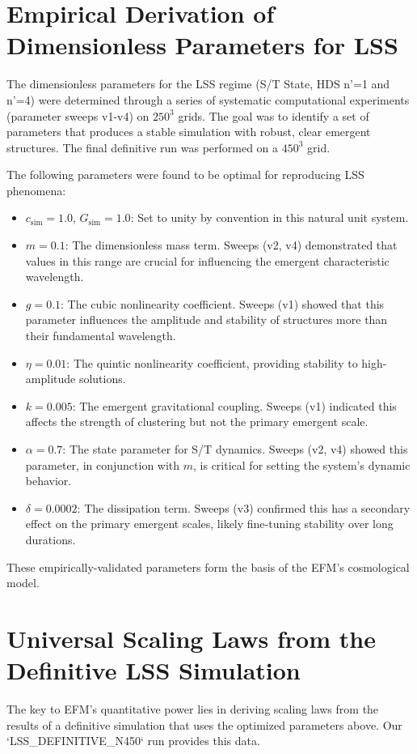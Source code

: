 \documentclass[11pt]{article}
\begin{document}
\section{Empirical Derivation of Dimensionless Parameters for LSS}
The dimensionless parameters for the LSS regime (S/T State, HDS n'=1 and n'=4) were determined through a series of systematic computational experiments (parameter sweeps v1-v4) on \(250^3\) grids. The goal was to identify a set of parameters that produces a stable simulation with robust, clear emergent structures. The final definitive run was performed on a \(450^3\) grid.

The following parameters were found to be optimal for reproducing LSS phenomena:
\begin{itemize}
    \item \textbf{$c_{\text{sim}} = 1.0$}, \textbf{$G_{\text{sim}} = 1.0$}: Set to unity by convention in this natural unit system.
    \item \textbf{$m = 0.1$}: The dimensionless mass term. Sweeps (v2, v4) demonstrated that values in this range are crucial for influencing the emergent characteristic wavelength.
    \item \textbf{$g = 0.1$}: The cubic nonlinearity coefficient. Sweeps (v1) showed that this parameter influences the amplitude and stability of structures more than their fundamental wavelength.
    \item \textbf{$\eta = 0.01$}: The quintic nonlinearity coefficient, providing stability to high-amplitude solutions.
    \item \textbf{$k = 0.005$}: The emergent gravitational coupling. Sweeps (v1) indicated this affects the strength of clustering but not the primary emergent scale.
    \item \textbf{$\alpha = 0.7$}: The state parameter for S/T dynamics. Sweeps (v2, v4) showed this parameter, in conjunction with \(m\), is critical for setting the system's dynamic behavior.
    \item \textbf{$\delta = 0.0002$}: The dissipation term. Sweeps (v3) confirmed this has a secondary effect on the primary emergent scales, likely fine-tuning stability over long durations.
\end{itemize}
These empirically-validated parameters form the basis of the EFM's cosmological model.

\section{Universal Scaling Laws from the Definitive LSS Simulation}
The key to EFM's quantitative power lies in deriving scaling laws from the results of a definitive simulation that uses the optimized parameters above. Our `LSS_DEFINITIVE_N450` run provides this data.
\end{document}
